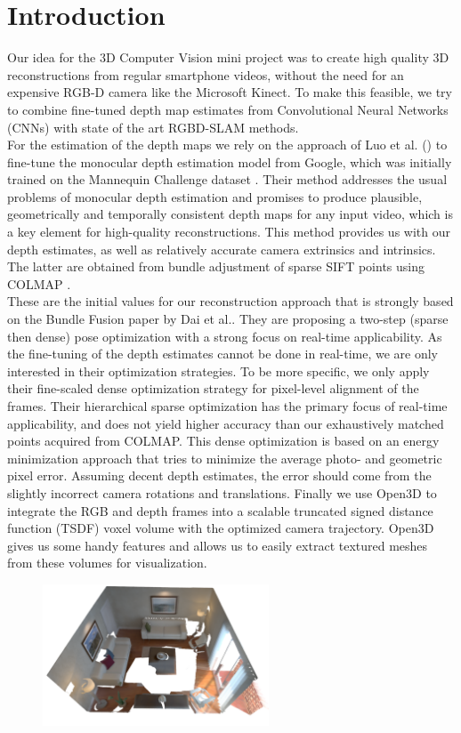 \chapter{Introduction}
    Our idea for the 3D Computer Vision mini project was to create high quality 3D reconstructions from regular smartphone videos, without the need for an expensive RGB-D camera like the Microsoft Kinect.
    To make this feasible, we try to combine fine-tuned depth map estimates from Convolutional Neural Networks (CNNs) with state of the art RGBD-SLAM methods.\\
    For the estimation of the depth maps we rely on the approach of Luo et al. \cite{luo2020consistent} () to fine-tune the monocular depth estimation model from Google, which was initially trained on the Mannequin Challenge dataset \cite{mannequin}.
    Their method addresses the usual problems of monocular depth estimation and promises to produce plausible, geometrically and temporally consistent depth maps for any input video, which is a key element for high-quality reconstructions.
    This method provides us with our depth estimates, as well as relatively accurate camera extrinsics and intrinsics. The latter are obtained from bundle adjustment of sparse SIFT points using COLMAP \cite{colmap}.\\
    These are the initial values for our reconstruction approach that is strongly based on the Bundle Fusion paper \cite{dai2017bundlefusion} by Dai et al..
    They are proposing a two-step (sparse then dense) pose optimization with a strong focus on real-time applicability.
    As the fine-tuning of the depth estimates cannot be done in real-time, we are only interested in their optimization strategies.
    To be more specific, we only apply their fine-scaled dense optimization strategy for pixel-level alignment of the frames. Their hierarchical sparse optimization has the primary focus of real-time applicability, and does not yield higher accuracy than our exhaustively matched points acquired from COLMAP.
    This dense optimization is based on an energy minimization approach that tries to minimize the average photo- and geometric pixel error. Assuming decent depth estimates, the error should come from the slightly incorrect camera rotations and translations.
    Finally we use Open3D \cite{open3d} to integrate the RGB and depth frames into a scalable truncated signed distance function (TSDF) voxel volume with the optimized camera trajectory. Open3D gives us some handy features and allows us to easily extract textured meshes from these volumes for visualization.

    \begin{figure}[!hb]
        \centering
        \includegraphics[width=0.6\textwidth]{images/gt_reconstruction.png}
    \end{figure}